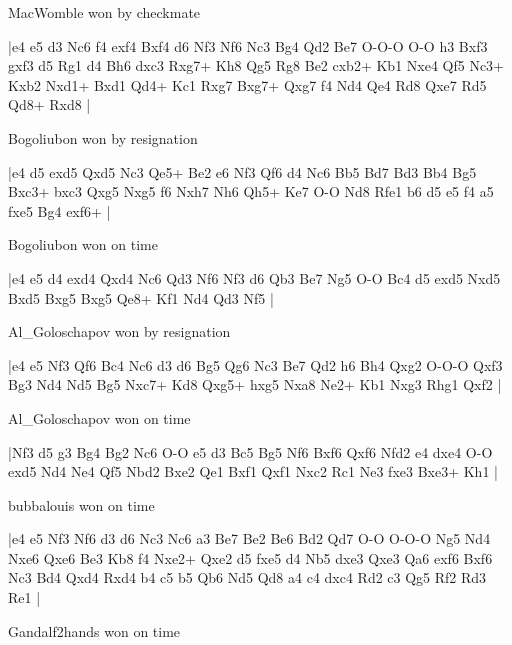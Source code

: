 MacWomble won by checkmate

\makegametitle
|e4 e5 d3 Nc6 f4 exf4 Bxf4 d6 Nf3 Nf6 Nc3 Bg4 Qd2 Be7 O-O-O O-O h3 Bxf3 gxf3 d5 Rg1 d4 Bh6 dxc3 Rxg7+ Kh8 Qg5 Rg8 Be2 cxb2+ Kb1 Nxe4 Qf5 Nc3+ Kxb2 Nxd1+ Bxd1 Qd4+ Kc1 Rxg7 Bxg7+ Qxg7 f4 Nd4 Qe4 Rd8 Qxe7 Rd5 Qd8+ Rxd8  |

\showboard

Bogoliubon won by resignation

\makegametitle
|e4 d5 exd5 Qxd5 Nc3 Qe5+ Be2 e6 Nf3 Qf6 d4 Nc6 Bb5 Bd7 Bd3 Bb4 Bg5 Bxc3+ bxc3 Qxg5 Nxg5 f6 Nxh7 Nh6 Qh5+ Ke7 O-O Nd8 Rfe1 b6 d5 e5 f4 a5 fxe5 Bg4 exf6+  |

\showboard

Bogoliubon won on time

\makegametitle
|e4 e5 d4 exd4 Qxd4 Nc6 Qd3 Nf6 Nf3 d6 Qb3 Be7 Ng5 O-O Bc4 d5 exd5 Nxd5 Bxd5 Bxg5 Bxg5 Qe8+ Kf1 Nd4 Qd3 Nf5  |

\showboard

Al\_Goloschapov won by resignation

\makegametitle
|e4 e5 Nf3 Qf6 Bc4 Nc6 d3 d6 Bg5 Qg6 Nc3 Be7 Qd2 h6 Bh4 Qxg2 O-O-O Qxf3 Bg3 Nd4 Nd5 Bg5 Nxc7+ Kd8 Qxg5+ hxg5 Nxa8 Ne2+ Kb1 Nxg3 Rhg1 Qxf2  |

\showboard

Al\_Goloschapov won on time

\makegametitle
|Nf3 d5 g3 Bg4 Bg2 Nc6 O-O e5 d3 Bc5 Bg5 Nf6 Bxf6 Qxf6 Nfd2 e4 dxe4 O-O exd5 Nd4 Ne4 Qf5 Nbd2 Bxe2 Qe1 Bxf1 Qxf1 Nxc2 Rc1 Ne3 fxe3 Bxe3+ Kh1  |

\showboard

bubbalouis won on time

\makegametitle
|e4 e5 Nf3 Nf6 d3 d6 Nc3 Nc6 a3 Be7 Be2 Be6 Bd2 Qd7 O-O O-O-O Ng5 Nd4 Nxe6 Qxe6 Be3 Kb8 f4 Nxe2+ Qxe2 d5 fxe5 d4 Nb5 dxe3 Qxe3 Qa6 exf6 Bxf6 Nc3 Bd4 Qxd4 Rxd4 b4 c5 b5 Qb6 Nd5 Qd8 a4 c4 dxc4 Rd2 c3 Qg5 Rf2 Rd3 Re1  |

\showboard

Gandalf2hands won on time

